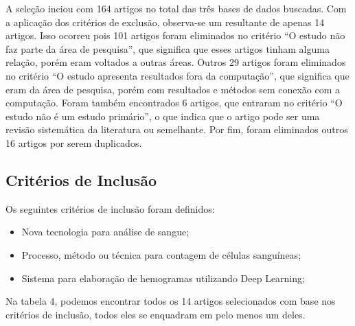A seleção inciou com 164 artigos no total das três bases de dados buscadas. Com a aplicação dos critérios de exclusão, observa-se um resultante de apenas 14 artigos. Isso ocorreu pois 101 artigos foram eliminados no critério ``O estudo não faz parte da área de pesquisa'', que significa que esses artigos tinham alguma relação, porém eram voltados a outras áreas. Outros 29 artigos foram eliminados no critério ``O estudo apresenta resultados fora da computação'', que significa que eram da área de pesquisa, porém com resultados e métodos sem conexão com a computação. Foram também encontrados 6 artigos, que entraram no critério ``O estudo não é um estudo primário'', o que indica que o artigo pode ser uma revisão sistemática da literatura ou semelhante. Por fim, foram eliminados outros 16 artigos por serem duplicados.

\subsection{Critérios de Inclusão}

Os seguintes critérios de inclusão foram definidos:
\begin{itemize}
\item Nova tecnologia para análise de sangue;
\item Processo, método ou técnica para contagem de células sanguíneas;
\item Sistema para elaboração de hemogramas utilizando Deep Learning;
\end{itemize}

Na tabela 4, podemos encontrar todos os 14 artigos selecionados com base nos critérios de inclusão, todos eles se enquadram em pelo menos um deles.

